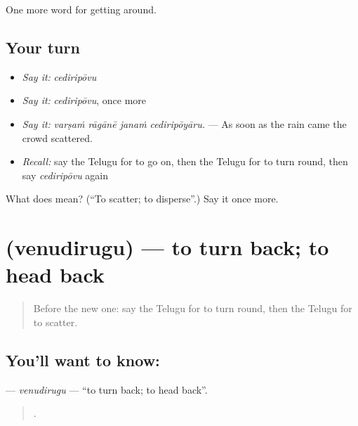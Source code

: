 \begin{grammarlens}[title={What you've built}]
One more word for getting around.
\end{grammarlens}

\subsection*{Your turn}
\begin{itemize}
\raggedright
  \item \emph{Say it:} \emph{cediripōvu}
  \item \emph{Say it:} \emph{cediripōvu}, once more
  \item \emph{Say it:} \emph{varṣaṁ rāgānē janaṁ cediripōyāru.} — As soon as the rain came the crowd scattered.
  \item \emph{Recall:} say the Telugu for to go on, then the Telugu for to turn round, then say \emph{cediripōvu} again
\end{itemize}

\begin{tcolorbox}[breakable,colback=teal!4,colframe=teal!35!black,title={Before you move on}]
What does  mean? (\textquotedblleft{}To scatter; to disperse\textquotedblright{}.) Say it once more.
\end{tcolorbox}
\section[\texorpdfstring{\te{వెనుదిరుగు} (venudirugu)}{వెనుదిరుగు (venudirugu)}]{ (venudirugu) — to turn back; to head back}

\label{lesson:TE-C493-venudirugu}



\begin{quote}
Before the new one: say the Telugu for to turn round, then the Telugu for to scatter.
\end{quote}

\subsection*{You'll want to know: }
\textbf{} — \emph{venudirugu} — \textquotedblleft{}to turn back; to head back\textquotedblright{}.

\begin{quote}
    .
\end{quote}

